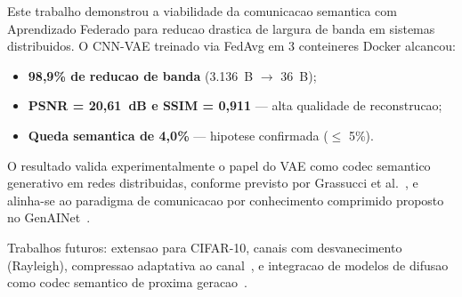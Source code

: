 \documentclass[conference]{IEEEtran}
\begin{document}
Este trabalho demonstrou a viabilidade da comunicacao semantica com Aprendizado
Federado para reducao drastica de largura de banda em sistemas distribuidos.
O CNN-VAE treinado via FedAvg em 3 conteineres Docker alcancou:

\begin{itemize}[leftmargin=*]
    \item \textbf{98,9\% de reducao de banda} (3.136~B $\rightarrow$ 36~B);
    \item \textbf{PSNR = 20,61~dB e SSIM = 0,911} --- alta qualidade de reconstrucao;
    \item \textbf{Queda semantica de 4,0\%} --- hipotese confirmada ($\leq$ 5\%).
\end{itemize}

O resultado valida experimentalmente o papel do VAE como codec semantico generativo
em redes distribuidas, conforme previsto por Grassucci et al.~\cite{grassucci2023genai_meets_semcom},
e alinha-se ao paradigma de comunicacao por conhecimento comprimido proposto
no GenAINet~\cite{du2023genainet}.

Trabalhos futuros: extensao para CIFAR-10, canais com desvanecimento (Rayleigh),
compressao adaptativa ao canal~\cite{xia2023gennet_layer}, e integracao de
modelos de difusao como codec semantico de proxima geracao~\cite{du2023genai_semcom}.



\end{document}
